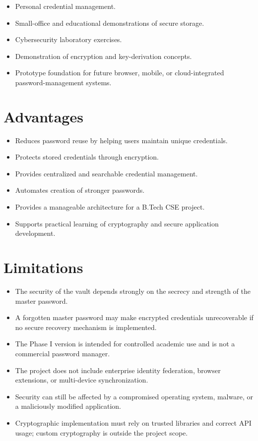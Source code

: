 \documentclass[12pt,a4paper,oneside]{report}
\begin{document}
\begin{itemize}
\item Personal credential management.
\item Small-office and educational demonstrations of secure storage.
\item Cybersecurity laboratory exercises.
\item Demonstration of encryption and key-derivation concepts.
\item Prototype foundation for future browser, mobile, or cloud-integrated password-management systems.
\end{itemize}

\section{Advantages}

\begin{itemize}
\item Reduces password reuse by helping users maintain unique credentials.
\item Protects stored credentials through encryption.
\item Provides centralized and searchable credential management.
\item Automates creation of stronger passwords.
\item Provides a manageable architecture for a B.Tech CSE project.
\item Supports practical learning of cryptography and secure application development.
\end{itemize}

\section{Limitations}

\begin{itemize}
\item The security of the vault depends strongly on the secrecy and strength of the master password.
\item A forgotten master password may make encrypted credentials unrecoverable if no secure recovery mechanism is implemented.
\item The Phase I version is intended for controlled academic use and is not a commercial password manager.
\item The project does not include enterprise identity federation, browser extensions, or multi-device synchronization.
\item Security can still be affected by a compromised operating system, malware, or a maliciously modified application.
\item Cryptographic implementation must rely on trusted libraries and correct API usage; custom cryptography is outside the project scope.
\end{itemize}
\end{document}
